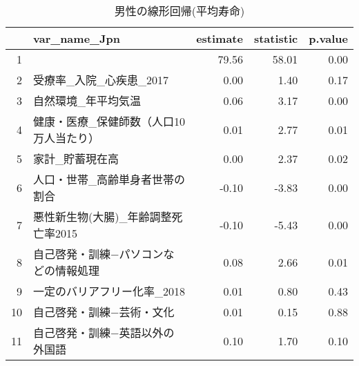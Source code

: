 \begin{table}[ht]
\centering
\begingroup\tiny
\begin{tabular}{rlrrr}
  \hline
 & var\_name\_Jpn & estimate & statistic & p.value \\ 
  \hline
1 &  & 79.56 & 58.01 & 0.00 \\ 
  2 & 受療率\_入院\_心疾患\_2017 & 0.00 & 1.40 & 0.17 \\ 
  3 & 自然環境\_年平均気温 & 0.06 & 3.17 & 0.00 \\ 
  4 & 健康・医療\_保健師数（人口10万人当たり） & 0.01 & 2.77 & 0.01 \\ 
  5 & 家計\_貯蓄現在高 & 0.00 & 2.37 & 0.02 \\ 
  6 & 人口・世帯\_高齢単身者世帯の割合 & -0.10 & -3.83 & 0.00 \\ 
  7 & 悪性新生物(大腸)\_年齢調整死亡率2015 & -0.10 & -5.43 & 0.00 \\ 
  8 & 自己啓発・訓練−パソコンなどの情報処理 & 0.08 & 2.66 & 0.01 \\ 
  9 & 一定のバリアフリー化率\_2018 & 0.01 & 0.80 & 0.43 \\ 
  10 & 自己啓発・訓練−芸術・文化 & 0.01 & 0.15 & 0.88 \\ 
  11 & 自己啓発・訓練−英語以外の外国語 & 0.10 & 1.70 & 0.10 \\ 
   \hline
\end{tabular}
\endgroup
\caption{男性の線形回帰(平均寿命)} 
\label{UsualLMLEm}
\end{table}
